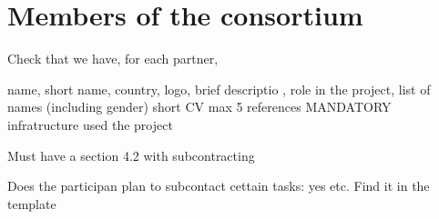 \chapter{Members of the consortium}


{\color{red}
  Check that we have, for each partner,

  name, short name, country, logo, brief descriptio , 
  role in the project,
  list of names (including gender)
  short CV
  max 5 references MANDATORY
  infratructure used the project}


{\color{red}

  Must have a section 4.2 with subcontracting




  Does the participan plan to subcontact cettain tasks: yes
  etc. Find it in the template

}


\label{sec:partners}

































